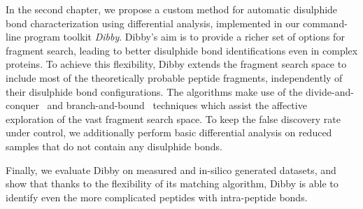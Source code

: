 In the second chapter, we propose a custom method for automatic disulphide bond characterization using differential analysis, implemented in our command-line program toolkit \emph{Dibby}. Dibby's aim is to provide a richer set of options for fragment search, leading to better disulphide bond identifications even in complex proteins. To achieve this flexibility, Dibby extends the fragment search space to include most of the theoretically probable peptide fragments, independently of their disulphide bond configurations. The algorithms make use of the divide-and-conquer~\cite{smith1985design} and branch-and-bound~\cite{boyd2007branch} techniques which assist the affective exploration of the vast fragment search space. To keep the false discovery rate under control, we additionally perform basic differential analysis on reduced samples that do not contain any disulphide bonds.

Finally, we evaluate Dibby on measured and in-silico generated datasets, and show that thanks to the flexibility of its matching algorithm, Dibby is able to identify even the more complicated peptides with intra-peptide bonds.
